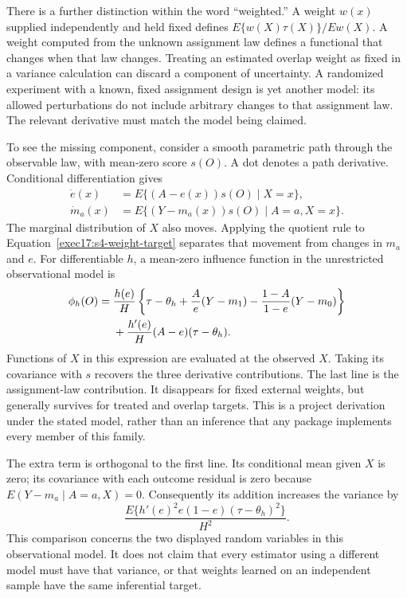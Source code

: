 There is a further distinction within the word ``weighted.'' A weight
$w(x)$ supplied independently and held fixed defines
$E\{w(X)\tau(X)\}/Ew(X)$. A weight computed from the unknown assignment law
defines a functional that changes when that law changes. Treating an estimated
overlap weight as fixed in a variance calculation can discard a component of
uncertainty. A randomized experiment with a known, fixed assignment design is
yet another model: its allowed perturbations do not include arbitrary changes
to that assignment law. The relevant derivative must match the model being
claimed.\citep{exec17_s4_math,dml2018}

To see the missing component, consider a smooth parametric path through the
observable law, with mean-zero score $s(O)$. A dot denotes a path derivative.
Conditional differentiation gives
\begin{align*}
 \dot e(x)&=E\{(A-e(x))s(O)\mid X=x\},\\
 \dot m_a(x)&=E\{(Y-m_a(x))s(O)\mid A=a,X=x\}.
\end{align*}
The marginal distribution of $X$ also moves. Applying the quotient rule to
Equation~\eqref{exec17:s4-weight-target} separates that movement from changes
in $m_a$ and $e$. For differentiable $h$, a mean-zero influence function in
the unrestricted observational model is
\begin{align}
 \phi_h(O)={}&\frac{h(e)}{H}
 \left\{\tau-\theta_h+\frac{A}{e}(Y-m_1)
                 -\frac{1-A}{1-e}(Y-m_0)\right\}\notag\\
 &+\frac{h'(e)}{H}(A-e)(\tau-\theta_h).
 \label{exec17:s4-weight-if}
\end{align}
Functions of $X$ in this expression are evaluated at the observed $X$.
Taking its covariance with $s$ recovers the three derivative contributions.
The last line is the assignment-law contribution. It disappears for fixed
external weights, but generally survives for treated and overlap targets.
This is a project derivation under the stated model, rather than an inference
that any package implements every member of this family.\citep{exec17_s4_math}

The extra term is orthogonal to the first line. Its conditional mean given
$X$ is zero; its covariance with each outcome residual is zero because
$E(Y-m_a\mid A=a,X)=0$. Consequently its addition increases the variance by
\begin{equation}
 \frac{E\{h'(e)^2e(1-e)(\tau-\theta_h)^2\}}{H^2}.
 \label{exec17:s4-extra-variance}
\end{equation}
This comparison concerns the two displayed random variables in this
observational model. It does not claim that every estimator using a different
model must have that variance, or that weights learned on an independent
sample have the same inferential target.

